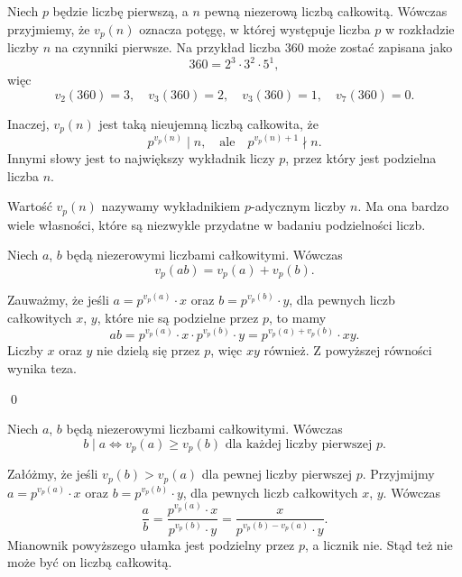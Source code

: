


\noindent
Niech $p$ będzie liczbę pierwszą, a $n$ pewną niezerową liczbą całkowitą. Wówczas przyjmiemy, że $v_p(n)$ oznacza potęgę, w której występuje liczba $p$ w rozkładzie liczby $n$ na czynniki pierwsze. Na przykład liczba $360$ może zostać zapisana jako
\[
	360 = 2^3 \cdot 3^2 \cdot 5^1,
\]
więc
\[
	v_2(360) = 3, \quad v_3(360) = 2, \quad v_3(360) = 1, \quad v_7(360) = 0.
\]

\vspace{10px}

\noindent
Inaczej, $v_p(n)$ jest taką nieujemną liczbą całkowita, że 
\[
	p^{v_p(n)} \mid n, \quad \text{ale} \quad p^{v_p(n) + 1} \nmid n.
\]
Innymi słowy jest to największy wykładnik liczy $p$, przez który jest podzielna liczba $n$.


\vspace{10px}

\noindent
Wartość $v_p(n)$ nazywamy wykładnikiem $p$-adycznym liczby $n$. Ma ona bardzo wiele własności, które są niezwykle przydatne w badaniu podzielności liczb.

\vspace{10px}


\noindent
Niech $a$, $b$ będą niezerowymi liczbami całkowitymi. Wówczas
\[
	v_p(ab) = v_p(a) + v_p(b).
\]


\noindent
Zauważmy, że jeśli $a = p^{v_p(a)} \cdot x$ oraz $b = p^{v_p(b)} \cdot y$, dla pewnych liczb całkowitych $x$, $y$, które nie są podzielne przez $p$, to mamy
\[
	ab = p^{v_p(a)} \cdot x \cdot p^{v_p(b)} \cdot y = p^{v_p(a) + v_p(b)} \cdot xy.
\] 
Liczby $x$ oraz $y$ nie dzielą się przez $p$, więc $xy$ również. Z powyższej równości wynika teza. 

\qed

\vspace{10px}


\noindent
Niech $a$, $b$ będą niezerowymi liczbami całkowitymi. Wówczas 
\[
	b \mid a \iff v_p(a) \geqslant v_p(b) \text{ dla każdej liczby pierwszej $p$.}
\]


\noindent
Załóżmy, że jeśli $v_p(b) > v_p(a)$ dla pewnej liczby pierwszej $p$. Przyjmijmy $a = p^{v_p(a)} \cdot x$ oraz $b = p^{v_p(b)} \cdot y$, dla pewnych liczb całkowitych $x$, $y$. Wówczas
\[
	\frac{a}{b} = \frac{p^{v_p(a)} \cdot x}{p^{v_p(b)} \cdot y}= \frac{x}{p^{v_p(b) - v_p(a)} \cdot y}.
\]
Mianownik powyższego ułamka jest podzielny przez $p$, a licznik nie. Stąd też nie może być on liczbą całkowitą.

